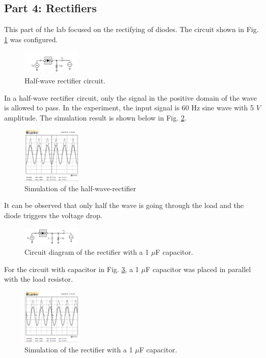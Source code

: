 \documentclass[letterpaper, 10 pt, conference]{ieeeconf}  %
\begin{document}
\subsection{Part 4: Rectifiers}
This part of the lab focused on the rectifying of diodes. The circuit
shown in Fig. \ref{fig:rectifier_1} was configured.
\begin{figure}[ht]
  \centering
  \includegraphics[width=0.25\textwidth]{images/rectifier_circuit.png}
  \caption{Half-wave rectifier circuit.}
  \label{fig:rectifier_1}
\end{figure}
\par In a half-wave rectifier circuit, only the signal in the positive domain of
the wave is allowed to pass. In the experiment, the input signal is 60 Hz sine wave
with 5 $V$ amplitude. The simulation result is shown below in Fig. \ref{fig:rectifier_2}.
\begin{figure}[!hb]
  \centering
  \includegraphics[width=0.25\textwidth]{images/halfwave.png}
  \caption{Simulation of the half-wave-rectifier}
  \label{fig:rectifier_2}
\end{figure}
\par It can be observed that only half the wave is going through the load and the diode
triggers the voltage drop.
\begin{figure}[!hb]
  \centering
  \includegraphics[width=0.25\textwidth]{images/rectifier_circuit_2.png}
  \caption{Circuit diagram of the rectifier with a 1 $\mu$F capacitor.}
  \label{fig:rectifier_3}
\end{figure}
\par For the circuit with capacitor in Fig. \ref{fig:rectifier_3}, a 1 $\mu$F
capacitor was placed in parallel with the load resistor.
\begin{figure}[!hb]
  \centering
  \includegraphics[width=0.25\textwidth]{images/halfwave_1miuf.png}
  \caption{Simulation of the rectifier with a 1 $\mu$F capacitor.}
  \label{fig:rectifier_4}
\end{figure}
\end{document}
